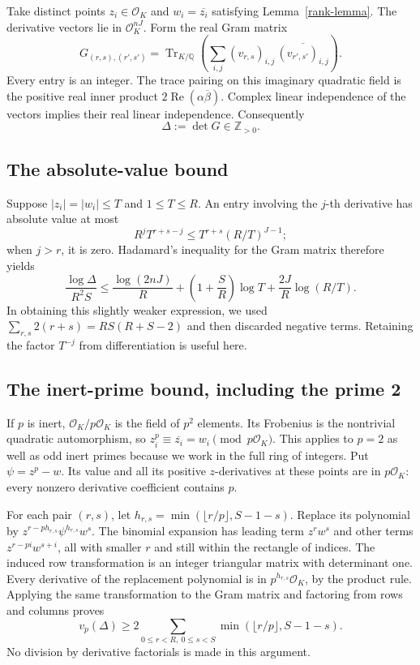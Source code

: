 \documentclass[11pt]{article}
\newcommand{\Z}{\mathbb Z}
\newcommand{\Q}{\mathbb Q}
\newcommand{\OK}{\mathcal O_K}
\newcommand{\Tr}{\operatorname{Tr}}
\begin{document}
Take distinct points \(z_i\in\OK\) and \(w_i=\overline{z_i}\) satisfying
Lemma~\ref{rank-lemma}. The derivative vectors lie in \(\OK^{nJ}\).
Form the real Gram matrix
\[
 G_{(r,s),(r',s')}=
 \Tr_{K/\Q}\!\left(\sum_{i,j}
 (v_{r,s})_{i,j}\,\overline{(v_{r',s'})_{i,j}}\right).
\]
Every entry is an integer. The trace pairing on this imaginary
quadratic field is the positive real inner product
\(2\operatorname{Re}(\alpha\overline\beta)\). Complex linear
independence of the vectors implies their real linear independence.
Consequently
\begin{equation}\label{positive-det}
 \Delta:=\det G\in\Z_{>0}.
\end{equation}

\subsection{The absolute-value bound}

Suppose \(|z_i|=|w_i|\le T\) and \(1\le T\le R\). An entry involving
the \(j\)-th derivative has absolute value at most
\[
 R^j T^{r+s-j}\le T^{r+s}(R/T)^{J-1};
\]
when \(j>r\), it is zero. Hadamard's inequality for the Gram matrix
therefore yields
\begin{equation}\label{arch}
 \frac{\log\Delta}{R^2S}
 \le\frac{\log(2nJ)}R
 +\left(1+\frac SR\right)\log T
 +\frac{2J}R\log(R/T).
\end{equation}
In obtaining this slightly weaker expression, we used
\(\sum_{r,s}2(r+s)=RS(R+S-2)\) and then discarded negative terms.
Retaining the factor \(T^{-j}\) from differentiation is useful here.

\subsection{The inert-prime bound, including the prime 2}

If \(p\) is inert, \(\OK/p\OK\) is the field of \(p^2\) elements.
Its Frobenius is the nontrivial quadratic automorphism, so
\(z_i^p\equiv\overline{z_i}=w_i\pmod{p\OK}\).
This applies to \(p=2\) as well as odd inert primes because we work
in the full ring of integers. Put \(\psi=z^p-w\).
Its value and all its positive \(z\)-derivatives at these points are
in \(p\OK\): every nonzero derivative coefficient contains \(p\).

For each pair \((r,s)\), let
\(h_{r,s}=\min(\lfloor r/p\rfloor,S-1-s)\).
Replace its polynomial by
\(z^{r-ph_{r,s}}\psi^{h_{r,s}}w^s\).
The binomial expansion has leading term \(z^r w^s\) and other terms
\(z^{r-pi}w^{s+i}\), all with smaller \(r\) and still within the
rectangle of indices. The induced row transformation is an integer
triangular matrix with determinant one. Every derivative of the
replacement polynomial is in \(p^{h_{r,s}}\OK\), by the product rule.
Applying the same transformation to the Gram matrix and factoring
from rows and columns proves
\begin{equation}\label{valuation}
 v_p(\Delta)\ge
 2\sum_{0\le r<R,\ 0\le s<S}\min(\lfloor r/p\rfloor,S-1-s).
\end{equation}
No division by derivative factorials is made in this argument.
\end{document}
